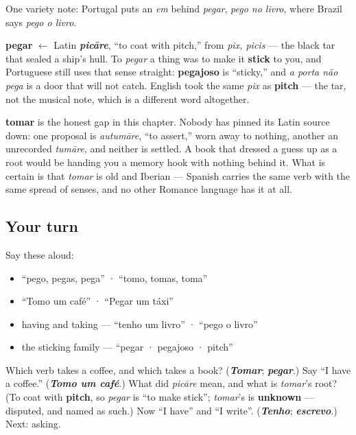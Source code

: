 One variety note: Portugal puts an \emph{em} behind \emph{pegar}, \emph{pego no livro}, where Brazil says \emph{pego o livro}.

\begin{cousinweb}
\textbf{pegar} $\leftarrow$ Latin \emph{\textbf{picāre}}, \textquotedblleft{}to coat with pitch,\textquotedblright{} from \emph{pix, picis} — the black tar that sealed a ship's hull. To \emph{pegar} a thing was to make it \textbf{stick} to you, and Portuguese still uses that sense straight: \textbf{pegajoso} is \textquotedblleft{}sticky,\textquotedblright{} and \emph{a porta não pega} is a door that will not catch. English took the same \emph{pix} as \textbf{pitch} — the tar, not the musical note, which is a different word altogether.

\textbf{tomar} is the honest gap in this chapter. Nobody has pinned its Latin source down: one proposal is \emph{autumāre}, \textquotedblleft{}to assert,\textquotedblright{} worn away to nothing, another an unrecorded \emph{tumāre}, and neither is settled. A book that dressed a guess up as a root would be handing you a memory hook with nothing behind it. What is certain is that \emph{tomar} is old and Iberian — Spanish carries the same verb with the same spread of senses, and no other Romance language has it at all.
\end{cousinweb}

\subsection*{Your turn}
Say these aloud:

\begin{itemize}
\raggedright
  \item \textquotedblleft{}pego, pegas, pega\textquotedblright{} · \textquotedblleft{}tomo, tomas, toma\textquotedblright{}
  \item \textquotedblleft{}Tomo um café\textquotedblright{} · \textquotedblleft{}Pegar um táxi\textquotedblright{}
  \item having and taking — \textquotedblleft{}tenho um livro\textquotedblright{} · \textquotedblleft{}pego o livro\textquotedblright{}
  \item the sticking family — \textquotedblleft{}pegar · pegajoso · pitch\textquotedblright{}
\end{itemize}

\begin{tcolorbox}[breakable,colback=teal!4,colframe=teal!35!black,title={Before you move on}]
Which verb takes a coffee, and which takes a book? (\emph{\textbf{Tomar}}; \emph{\textbf{pegar}}.) Say \textquotedblleft{}I have a coffee.\textquotedblright{} (\emph{\textbf{Tomo um café}}.) What did \emph{picāre} mean, and what is \emph{tomar}'s root? (To coat with \textbf{pitch}, so \emph{pegar} is \textquotedblleft{}to make stick\textquotedblright{}; \emph{tomar}'s is \textbf{unknown} — disputed, and named as such.) Now \textquotedblleft{}I have\textquotedblright{} and \textquotedblleft{}I write\textquotedblright{}. (\emph{\textbf{Tenho}}; \emph{\textbf{escrevo}}.) Next: asking.
\end{tcolorbox}
